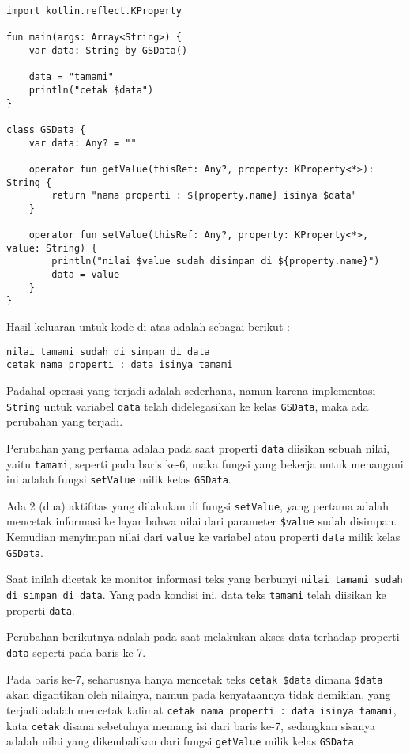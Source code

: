 \begin{lstlisting}
import kotlin.reflect.KProperty

fun main(args: Array<String>) {
	var data: String by GSData()
	
	data = "tamami"
	println("cetak $data")
}

class GSData {
	var data: Any? = ""

	operator fun getValue(thisRef: Any?, property: KProperty<*>): String {
		return "nama properti : ${property.name} isinya $data"
	}
	
	operator fun setValue(thisRef: Any?, property: KProperty<*>, value: String) {
		println("nilai $value sudah disimpan di ${property.name}")
		data = value
	}
}
\end{lstlisting}

Hasil keluaran untuk kode di atas adalah sebagai berikut :

\begin{lstlisting}
nilai tamami sudah di simpan di data
cetak nama properti : data isinya tamami
\end{lstlisting}

Padahal operasi yang terjadi adalah sederhana, namun karena implementasi \texttt{String} untuk variabel \texttt{data} telah didelegasikan ke kelas \texttt{GSData}, maka ada perubahan yang terjadi. 

Perubahan yang pertama adalah pada saat properti \texttt{data} diisikan sebuah nilai, yaitu \texttt{tamami}, seperti pada baris ke-6, maka fungsi yang bekerja untuk menangani ini adalah fungsi \texttt{setValue} milik kelas \texttt{GSData}.

Ada 2 (dua) aktifitas yang dilakukan di fungsi \texttt{setValue}, yang pertama adalah mencetak informasi ke layar bahwa nilai dari parameter \texttt{\$value} sudah disimpan. Kemudian menyimpan nilai dari \texttt{value} ke variabel atau properti \texttt{data} milik kelas \texttt{GSData}.

Saat inilah dicetak ke monitor informasi teks yang berbunyi \texttt{nilai tamami sudah di simpan di data}. Yang pada kondisi ini, data teks \texttt{tamami} telah diisikan ke properti \texttt{data}.

Perubahan berikutnya adalah pada saat melakukan akses data terhadap properti \texttt{data} seperti pada baris ke-7.

Pada baris ke-7, seharusnya hanya mencetak teks \texttt{cetak \$data} dimana \texttt{\$data} akan digantikan oleh nilainya, namun pada kenyataannya tidak demikian, yang terjadi adalah mencetak kalimat \texttt{cetak nama properti : data isinya tamami}, kata \texttt{cetak} disana sebetulnya memang isi dari baris ke-7, sedangkan sisanya adalah nilai yang dikembalikan dari fungsi \texttt{getValue} milik kelas \texttt{GSData}.

